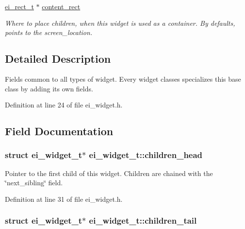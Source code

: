 \begin{DoxyCompactItemize}
\hyperlink{structei__rect__t}{ei\-\_\-rect\-\_\-t} $\ast$ \hyperlink{structei__widget__t_a75c29d388a5f5b32cdd8a9c855bc2a75}{content\-\_\-rect}
\begin{DoxyCompactList}\small\item\em Where to place children, when this widget is used as a container. By defaults, points to the screen\-\_\-location. \end{DoxyCompactList}\end{DoxyCompactItemize}


\subsection{Detailed Description}
Fields common to all types of widget. Every widget classes specializes this base class by adding its own fields. 

Definition at line 24 of file ei\-\_\-widget.\-h.



\subsection{Field Documentation}
\hypertarget{structei__widget__t_a190316f0ec41d2d98b919414c860f828}{
\subsubsection[{children\-\_\-head}]{\setlength{\rightskip}{0pt plus 5cm}struct {\bf ei\-\_\-widget\-\_\-t}$\ast$ ei\-\_\-widget\-\_\-t\-::children\-\_\-head}}\label{structei__widget__t_a190316f0ec41d2d98b919414c860f828}


Pointer to the first child of this widget. Children are chained with the \char`\"{}next\-\_\-sibling\char`\"{} field. 



Definition at line 31 of file ei\-\_\-widget.\-h.

\hypertarget{structei__widget__t_aece2f3059f252538ae787857e7eea2a2}{
\subsubsection[{children\-\_\-tail}]{\setlength{\rightskip}{0pt plus 5cm}struct {\bf ei\-\_\-widget\-\_\-t}$\ast$ ei\-\_\-widget\-\_\-t\-::children\-\_\-tail}}\label{structei__widget__t_aece2f3059f252538ae787857e7eea2a2}


